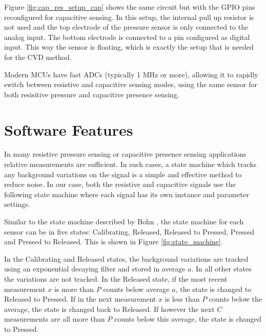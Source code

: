 \documentclass{sigchi-ext}
\begin{document}
Figure \ref{fig:cap_res_setup_cap} shows the same circuit but with the GPIO pins
reconfigured for capacitive sensing. In this setup, the internal pull up
resistor is not used and the top electrode of the pressure sensor is only
connected to the analog input. The bottom electrode is connected to a pin 
configured as digital input. This way the sensor is
floating, which is exactly the setup that is needed for the CVD method.

Modern MCUs have fast ADCs (typically 1 MHz or more), allowing it to rapidly switch between
resistive and capacitive sensing modes, using the same sensor for both
resisitive pressure and capacitive presence sensing.

\section{Software Features}
In many resistive pressure sensing or capacitive presence sensing
applications relative measurements are sufficient. In such cases, a state
machine which tracks any background variations on the signal is a simple
and effective method to reduce noise. In our case, both the resistive
and capacitive signals use the following state machine where
each signal has its own instance and parameter settings.

Similar to the state machine described by Bohn \cite{Bohn2009}, the state
machine for each sensor can be in five states: Calibrating, Released, Released
to Pressed, Pressed and Pressed to Released. This is shown in Figure
\ref{fig:state_machine}.

In the Calibrating and Released states, the background variations are tracked
using an exponential decaying filter and stored in average $a$. In all other
states the variations are not tracked. In the Released state, if the
most recent measurement $x$ is more than $P$ counts below average $a$, the state
is changed to Released to Pressed. If in the next measurement $x$ is less
than $P$ counts below the average, the state is changed back to Released. If
however the next $C$ measurements are all more than $P$ counts below this
average, the state is changed to Pressed.
\end{document}
